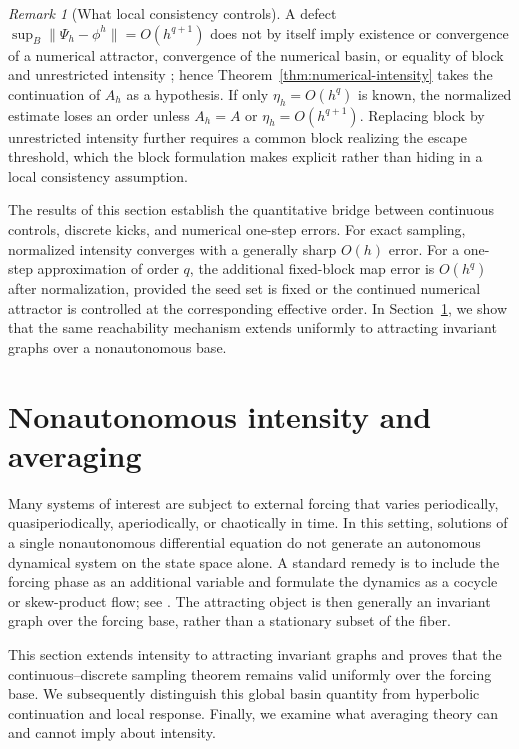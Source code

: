 \documentclass[pdflatex,sn-mathphys-num]{sn-jnl}
\numberwithin{equation}{section}
\theoremstyle{thmstyleone}%
\theoremstyle{definition}
\theoremstyle{remark}
\newtheorem{remark}[theorem]{Remark}
\begin{document}
\begin{remark}[What local consistency controls]
A defect $\sup_B\|\Psi_h-\phi^h\|=O(h^{q+1})$ does not by itself imply existence or convergence of a numerical attractor, convergence of the numerical basin, or equality of block and unrestricted intensity \citep{kloeden1986stable,grune2001asymptotic,garay2005attractors}; hence Theorem~\ref{thm:numerical-intensity} takes the continuation of $A_h$ as a hypothesis. If only $\eta_h=O(h^q)$ is known, the normalized estimate loses an order unless $A_h=A$ or $\eta_h=O(h^{q+1})$. Replacing block by unrestricted intensity further requires a common block realizing the escape threshold, which the block formulation makes explicit rather than hiding in a local consistency assumption.
\end{remark}

The results of this section establish the quantitative bridge between continuous controls, discrete kicks, and numerical one-step errors. For exact sampling, normalized intensity converges with a generally sharp $O(h)$ error. For a one-step approximation of order $q$, the additional fixed-block map error is $O(h^q)$ after normalization, provided the seed set is fixed or the continued numerical attractor is controlled at the corresponding effective order. In Section~\ref{sec:nonautonomous}, we show that the same reachability mechanism extends uniformly to attracting invariant graphs over a nonautonomous base.

\section{Nonautonomous intensity and averaging}
\label{sec:nonautonomous}

Many systems of interest are subject to external forcing that varies periodically, quasiperiodically, aperiodically, or chaotically in time. In this setting, solutions of a single nonautonomous differential equation do not generate an autonomous dynamical system on the state space alone. A standard remedy is to include the forcing phase as an additional variable and formulate the dynamics as a cocycle or skew-product flow; see \citep{kloeden2011nonautonomous,carvalho2012attractors}. The attracting object is then generally an invariant graph over the forcing base, rather than a stationary subset of the fiber.

This section extends intensity to attracting invariant graphs and proves that the continuous--discrete sampling theorem remains valid uniformly over the forcing base. We subsequently distinguish this global basin quantity from hyperbolic continuation and local response. Finally, we examine what averaging theory can and cannot imply about intensity.
\end{document}
